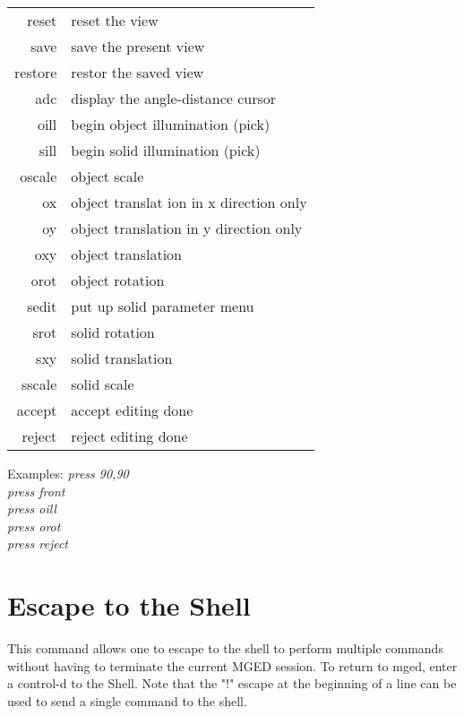 \begin{tabular}{rl}
       reset         &  reset the view \\
       save          &  save the present view \\
       restore       &  restor the saved view \\
       adc           & display the angle-distance cursor \\
       oill          &  begin object illumination (pick) \\
       sill          & begin solid illumination (pick) \\
       oscale        & object scale \\
       ox            & object translat ion in x direction only \\
       oy            & object translation in y direction only \\
       oxy           & object translation \\
       orot          & object rotation \\
       sedit         & put up solid parameter menu \\
       srot          & solid rotation \\
       sxy           & solid translation \\
       sscale        & solid scale \\
       accept        & accept editing done \\
       reject        & reject editing done \\
\end{tabular}

Examples:
{\em
         press 90,90 \\
         press front \\
         press oill \\
         press orot \\
         press reject \\
}

\section{Escape to the Shell}

{\em\center
%
}

This command allows one to escape to the shell to perform multiple commands
without having to terminate the current MGED session.
To return to mged, enter a control-d to the Shell.
Note that the "!" escape at the beginning of a line can be used
to send a single command to the shell.

